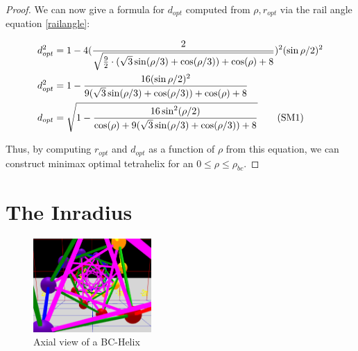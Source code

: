 \documentclass[review]{siamonline1116}
\newcommand\numberthis{\addtocounter{equation}{1}\tag{\theequation}}
\begin{document}
\begin{proof}
We can now give a formula for $ d_{opt} $ computed from $\rho, r_{opt}$ via the rail angle equation \eqref{railangle}:

\begin{align*}
  d_{opt}^2 &= 1 - 4 (\frac{2}{\sqrt{\frac{9}{2} \cdot ( \sqrt{3} \sin(\rho/3) + \cos(\rho/3)) + \cos(\rho)+ 8 }})^2 (\sin{ \rho / 2})^2   \\
  d_{opt}^2 &= 1 - \frac{16(\sin{ \rho / 2})^2}{9 ( \sqrt{3} \sin(\rho/3) + \cos(\rho/3)) + \cos(\rho)+ 8 }    \\
    d_{opt} &= \sqrt{1 - \frac{16 \sin^2(\rho / 2) }{ \cos(\rho) + 9( \sqrt{3} \sin(\rho/3) + \cos(\rho/3)) + 8 }}    \numberthis  \label{dopt}  \\      
\end{align*}

Thus, by computing $r_{opt}$  and $d_{opt}$ as a function of $\rho$ from this equation, we can construct minimax optimal tetrahelix for an $0 \leq \rho \leq \rho_{bc}$.
\end{proof}

\section{The Inradius}

\begin{figure}[H]
     \centering
     \includegraphics[width=0.4\textwidth]{figures/AxialView.png}
     \caption{Axial view of a BC-Helix}
  \label{axialview}     
\end{figure}
\end{document}
